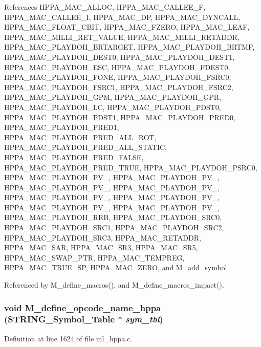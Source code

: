 References HPPA\_\-MAC\_\-ALLOC, HPPA\_\-MAC\_\-CALLEE\_\-F, HPPA\_\-MAC\_\-CALLEE\_\-I, HPPA\_\-MAC\_\-DP, HPPA\_\-MAC\_\-DYNCALL, HPPA\_\-MAC\_\-FLOAT\_\-CBIT, HPPA\_\-MAC\_\-FZERO, HPPA\_\-MAC\_\-LEAF, HPPA\_\-MAC\_\-MILLI\_\-RET\_\-VALUE, HPPA\_\-MAC\_\-MILLI\_\-RETADDR, HPPA\_\-MAC\_\-PLAYDOH\_\-BRTARGET, HPPA\_\-MAC\_\-PLAYDOH\_\-BRTMP, HPPA\_\-MAC\_\-PLAYDOH\_\-DEST0, HPPA\_\-MAC\_\-PLAYDOH\_\-DEST1, HPPA\_\-MAC\_\-PLAYDOH\_\-ESC, HPPA\_\-MAC\_\-PLAYDOH\_\-FDEST0, HPPA\_\-MAC\_\-PLAYDOH\_\-FONE, HPPA\_\-MAC\_\-PLAYDOH\_\-FSRC0, HPPA\_\-MAC\_\-PLAYDOH\_\-FSRC1, HPPA\_\-MAC\_\-PLAYDOH\_\-FSRC2, HPPA\_\-MAC\_\-PLAYDOH\_\-GPM, HPPA\_\-MAC\_\-PLAYDOH\_\-GPR, HPPA\_\-MAC\_\-PLAYDOH\_\-LC, HPPA\_\-MAC\_\-PLAYDOH\_\-PDST0, HPPA\_\-MAC\_\-PLAYDOH\_\-PDST1, HPPA\_\-MAC\_\-PLAYDOH\_\-PRED0, HPPA\_\-MAC\_\-PLAYDOH\_\-PRED1, HPPA\_\-MAC\_\-PLAYDOH\_\-PRED\_\-ALL\_\-ROT, HPPA\_\-MAC\_\-PLAYDOH\_\-PRED\_\-ALL\_\-STATIC, HPPA\_\-MAC\_\-PLAYDOH\_\-PRED\_\-FALSE, HPPA\_\-MAC\_\-PLAYDOH\_\-PRED\_\-TRUE, HPPA\_\-MAC\_\-PLAYDOH\_\-PSRC0, HPPA\_\-MAC\_\-PLAYDOH\_\-PV\_, HPPA\_\-MAC\_\-PLAYDOH\_\-PV\_, HPPA\_\-MAC\_\-PLAYDOH\_\-PV\_, HPPA\_\-MAC\_\-PLAYDOH\_\-PV\_, HPPA\_\-MAC\_\-PLAYDOH\_\-PV\_, HPPA\_\-MAC\_\-PLAYDOH\_\-PV\_, HPPA\_\-MAC\_\-PLAYDOH\_\-PV\_, HPPA\_\-MAC\_\-PLAYDOH\_\-PV\_, HPPA\_\-MAC\_\-PLAYDOH\_\-RRB, HPPA\_\-MAC\_\-PLAYDOH\_\-SRC0, HPPA\_\-MAC\_\-PLAYDOH\_\-SRC1, HPPA\_\-MAC\_\-PLAYDOH\_\-SRC2, HPPA\_\-MAC\_\-PLAYDOH\_\-SRC3, HPPA\_\-MAC\_\-RETADDR, HPPA\_\-MAC\_\-SAR, HPPA\_\-MAC\_\-SR3, HPPA\_\-MAC\_\-SR5, HPPA\_\-MAC\_\-SWAP\_\-PTR, HPPA\_\-MAC\_\-TEMPREG, HPPA\_\-MAC\_\-TRUE\_\-SP, HPPA\_\-MAC\_\-ZERO, and M\_\-add\_\-symbol.

Referenced by M\_\-define\_\-macros(), and M\_\-define\_\-macros\_\-impact().
\subsubsection{\setlength{\rightskip}{0pt plus 5cm}void M\_\-define\_\-opcode\_\-name\_\-hppa (\bf{STRING\_\-Symbol\_\-Table} $\ast$ {\em sym\_\-tbl})}\label{m__hppa_8h_ab0d3979f76e536bdffa06ab59a0d244}




Definition at line 1624 of file ml\_\-hppa.c.

